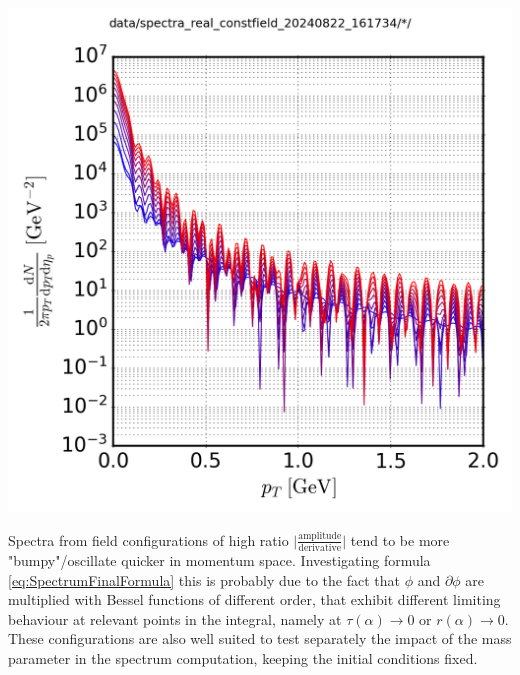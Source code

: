 {\begin{minipage}{\linewidth}
{\begin{minipage}{0.4\linewidth}
                \includegraphics[width=\linewidth]{code/C++/DCCspec/data/images/spectra_real_constfield_20240822_161734_spec.png}        
            \end{minipage}
        }
    \end{minipage}
}
Spectra from field configurations of high ratio ${\Big\vert\frac{\text{amplitude}}{\text{derivative}}\Big\vert}$ tend to be more "bumpy"/oscillate quicker in momentum space. Investigating formula \eqref{eq:SpectrumFinalFormula} this is probably due to the fact that $\phi$ and $\partial\phi$ are multiplied with Bessel functions of different order, that exhibit different limiting behaviour at relevant points in the integral, namely at ${\tau(\alpha)\to0}$ or ${r(\alpha)\to0}$. These configurations are also well suited to test separately the impact of the mass parameter in the spectrum computation, keeping the initial conditions fixed.\\
